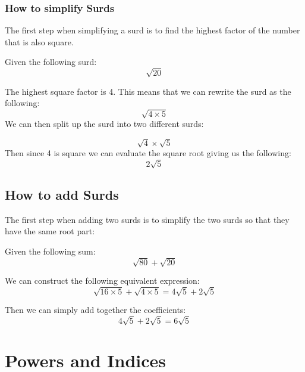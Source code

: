 \documentclass[a4paper]{article}
\begin{document}
\pagebreak 

\subsubsection{How to simplify Surds}
The first step when simplifying a surd is to find the highest factor of the number that is also square.

Given the following surd:
\begin{equation}
	\sqrt{20}
\end{equation}

The highest square factor is 4. This means that we can rewrite the surd as the following:
\begin{equation}
	\sqrt{4 \times 5}
\end{equation}
We can then split up the surd into two different surds:

\begin{equation}
	\sqrt{4} \times \sqrt{5}
\end{equation}
Then since 4 is square we can evaluate the square root giving us the following:
\begin{equation}
	2 \sqrt{5}
\end{equation}

\subsection{How to add Surds}
The first step when adding two surds is to simplify the two surds so that they have the same root part:

Given the following sum:
\begin{equation}
	\sqrt{80} + \sqrt{20}
\end{equation}

We can construct the following equivalent expression:
\begin{equation}
	\sqrt{16 \times 5} + \sqrt{4 \times 5} = 4\sqrt{5} + 2\sqrt{5}
\end{equation}

Then we can simply add together the coefficients:
\begin{equation}
	4\sqrt{5} + 2\sqrt{5} = 6\sqrt{5}
\end{equation}

\pagebreak 

\section{Powers and Indices}
\end{document}
